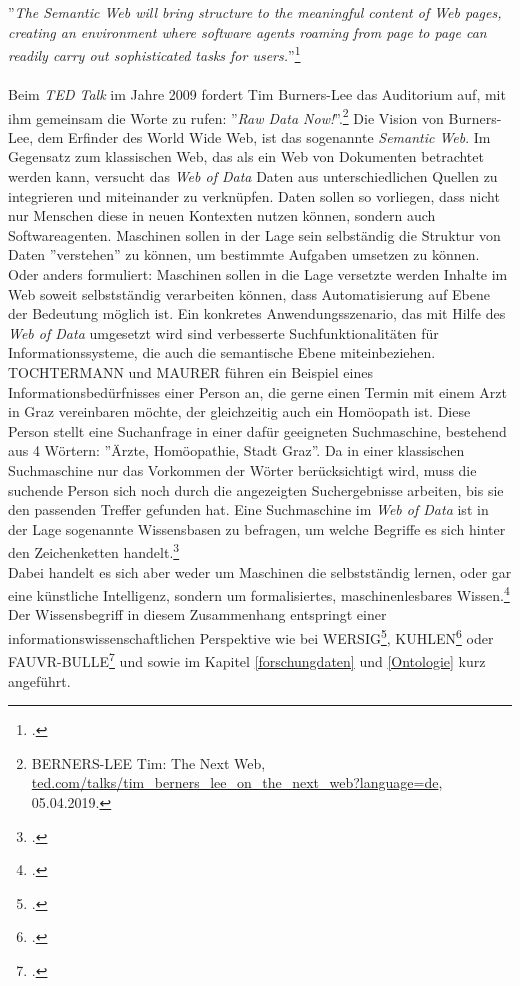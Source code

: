\documentclass[12pt,a4paper]{article}
\begin{document}
''\textit{The Semantic Web will bring structure to the meaningful content of Web pages, creating an environment where software agents roaming from page to page can readily carry out sophisticated tasks for users.}''\footcite[][S.3]{berners2001semantic}
\\
\\
Beim \textit{TED Talk} im Jahre 2009 fordert Tim Burners-Lee das Auditorium auf, mit ihm gemeinsam die Worte zu rufen: ''\textit{Raw Data Now!}''.\footnote{BERNERS-LEE Tim: The Next Web, \url{ted.com/talks/tim_berners_lee_on_the_next_web?language=de}, 05.04.2019.} Die Vision von Burners-Lee, dem Erfinder des World Wide Web, ist das sogenannte \textit{Semantic Web}. Im Gegensatz zum klassischen Web, das als ein Web von Dokumenten betrachtet werden kann, versucht das \textit{Web of Data} Daten aus unterschiedlichen Quellen zu integrieren und miteinander zu verknüpfen. Daten sollen so vorliegen, dass nicht nur Menschen diese in neuen Kontexten nutzen können, sondern auch Softwareagenten. Maschinen sollen in der Lage sein selbständig die Struktur von Daten ''verstehen'' zu können, um bestimmte Aufgaben umsetzen zu können. Oder anders formuliert: Maschinen sollen in die Lage versetzte werden Inhalte im Web soweit selbstständig verarbeiten können, dass Automatisierung auf Ebene der Bedeutung möglich ist. Ein konkretes Anwendungsszenario, das mit Hilfe des \textit{Web of Data} umgesetzt wird sind verbesserte Suchfunktionalitäten für Informationssysteme, die auch die semantische Ebene miteinbeziehen. TOCHTERMANN und MAURER führen ein Beispiel eines Informationsbedürfnisses einer Person an, die gerne einen Termin mit einem Arzt in Graz vereinbaren möchte, der gleichzeitig auch ein Homöopath ist. Diese Person stellt eine Suchanfrage in einer dafür geeigneten Suchmaschine, bestehend aus 4 Wörtern: ''Ärzte, Homöopathie, Stadt Graz''. Da in einer klassischen Suchmaschine nur das Vorkommen der Wörter berücksichtigt wird, muss die suchende Person sich noch durch die angezeigten Suchergebnisse arbeiten, bis sie den passenden Treffer gefunden hat. Eine Suchmaschine im \textit{Web of Data} ist in der Lage sogenannte Wissensbasen zu befragen, um welche Begriffe es sich hinter den Zeichenketten handelt.\footcite[S.1-2]{pellegrini2006semantic} 
\\
Dabei handelt es sich aber weder um Maschinen die selbstständig lernen, oder gar eine künstliche Intelligenz, sondern um formalisiertes, maschinenlesbares Wissen.\footcite[S.1-6]{pellegrini2006semantic} Der Wissensbegriff in diesem Zusammenhang entspringt einer informationswissenschaftlichen Perspektive wie bei WERSIG\footcite{wersig1971information}, KUHLEN\footcite{weller2013InformationBand} oder FAUVR-BULLE\footcite{favre2001information} und sowie im Kapitel \ref{forschungdaten} und \ref{Ontologie} kurz angeführt.
\end{document}

